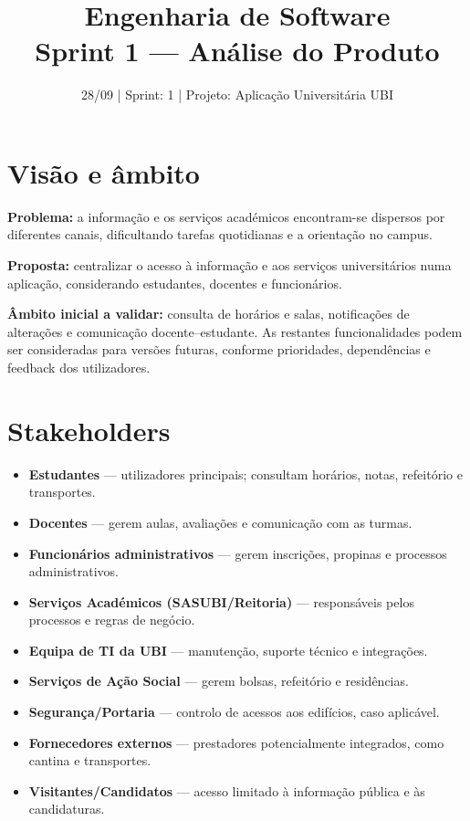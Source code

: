 \documentclass[12pt,a4paper]{article}
\title{Engenharia de Software\\Sprint 1 --- Análise do Produto}
\author{}
\date{28/09 \quad | \quad Sprint: 1 \quad | \quad Projeto: Aplicação Universitária UBI}
\begin{document}
\maketitle
\section{Visão e âmbito}
\textbf{Problema:} a informação e os serviços académicos encontram-se dispersos por diferentes canais, dificultando tarefas quotidianas e a orientação no campus.\par
\textbf{Proposta:} centralizar o acesso à informação e aos serviços universitários numa aplicação, considerando estudantes, docentes e funcionários.\par
\textbf{Âmbito inicial a validar:} consulta de horários e salas, notificações de alterações e comunicação docente--estudante. As restantes funcionalidades podem ser consideradas para versões futuras, conforme prioridades, dependências e feedback dos utilizadores.
\section{Stakeholders}
\begin{itemize}
\item \textbf{Estudantes} --- utilizadores principais; consultam horários, notas, refeitório e transportes.
\item \textbf{Docentes} --- gerem aulas, avaliações e comunicação com as turmas.
\item \textbf{Funcionários administrativos} --- gerem inscrições, propinas e processos administrativos.
\item \textbf{Serviços Académicos (SASUBI/Reitoria)} --- responsáveis pelos processos e regras de negócio.
\item \textbf{Equipa de TI da UBI} --- manutenção, suporte técnico e integrações.
\item \textbf{Serviços de Ação Social} --- gerem bolsas, refeitório e residências.
\item \textbf{Segurança/Portaria} --- controlo de acessos aos edifícios, caso aplicável.
\item \textbf{Fornecedores externos} --- prestadores potencialmente integrados, como cantina e transportes.
\item \textbf{Visitantes/Candidatos} --- acesso limitado à informação pública e às candidaturas.
\end{itemize}
\end{document}
